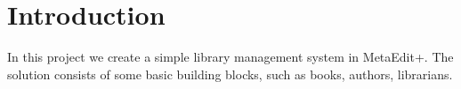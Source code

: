 \section{Introduction}
In this project we create a simple library management system in MetaEdit+. The solution consists of some basic building blocks, such as books, authors, librarians. 